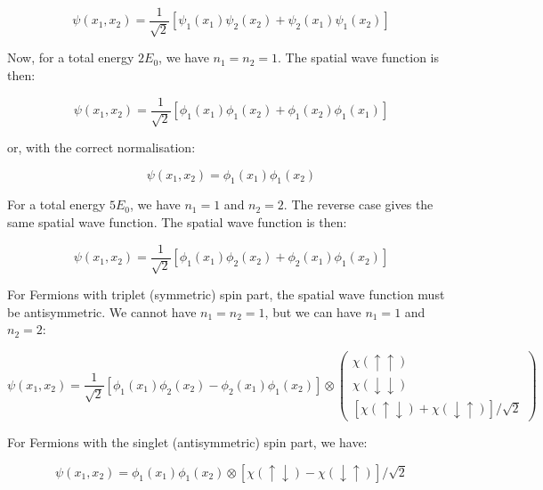 \documentclass[12pt]{article}
\begin{document}
\begin{equation}
    \psi(x_{1}, x_{2}) = \frac{1}{\sqrt{2}}\left[\psi_{1}(x_{1})\psi_{2}(x_{2}) + \psi_{2}(x_{1})\psi_{1}(x_{2})\right]
\end{equation}

Now, for a total energy $2E_{0}$, we have $n_{1} = n_{2} = 1$. The spatial wave function is then:

\begin{equation}
    \psi(x_{1}, x_{2}) = \frac{1}{\sqrt{2}}\left[\phi_{1}(x_{1})\phi_{1}(x_{2}) + \phi_{1}(x_{2})\phi_{1}(x_{1})\right]
\end{equation}

or, with the correct normalisation:

\begin{equation}
    \psi(x_{1}, x_{2}) = \phi_{1}(x_{1})\phi_{1}(x_{2})
\end{equation}

For a total energy $5E_{0}$, we have $n_{1} = 1$ and $n_{2} = 2$. The reverse case gives the same spatial wave function. The spatial wave function is then:

\begin{equation}
    \psi(x_{1}, x_{2}) = \frac{1}{\sqrt{2}}\left[\phi_{1}(x_{1})\phi_{2}(x_{2}) + \phi_{2}(x_{1})\phi_{1}(x_{2})\right]
\end{equation}

For Fermions with triplet (symmetric) spin part, the spatial wave function must be antisymmetric. We cannot have $n_{1} = n_{2} = 1$, but we can have $n_{1} = 1$ and $n_{2} = 2$:

\begin{equation}
    \psi(x_{1}, x_{2}) = \frac{1}{\sqrt{2}}\left[\phi_{1}(x_{1})\phi_{2}(x_{2}) - \phi_{2}(x_{1})\phi_{1}(x_{2})\right] \otimes
    \begin{pmatrix}
        \chi(\uparrow \uparrow)     \\
        \chi(\downarrow \downarrow) \\
        [\chi(\uparrow \downarrow) + \chi(\downarrow \uparrow)]/\sqrt{2}
    \end{pmatrix}
\end{equation}

For Fermions with the singlet (antisymmetric) spin part, we have:

\begin{equation}
    \psi(x_{1}, x_{2}) = \phi_{1}(x_{1})\phi_{1}(x_{2}) \otimes [\chi(\uparrow \downarrow) - \chi(\downarrow \uparrow)]/\sqrt{2}
\end{equation}
\end{document}
